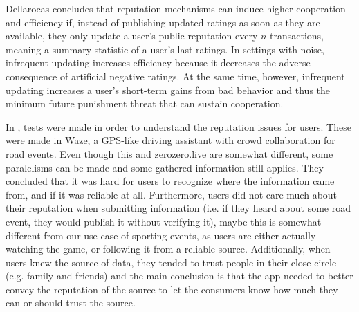 Dellarocas \cite{Dellarocas2006-update-freq} concludes that reputation mechanisms can induce higher cooperation and efficiency if, instead of publishing updated ratings as soon as they are available, they only update a user's public reputation every $n$ transactions, meaning a summary statistic of a user's last ratings. In settings with noise, infrequent updating increases efficiency because it decreases the adverse consequence of artificial negative ratings. At the same time, however, infrequent updating increases a user's short-term gains from bad behavior and thus the minimum future punishment threat that can sustain cooperation.

In \cite{Afonso2016}, tests were made in order to understand the reputation issues for users. These were made in Waze, a GPS-like driving assistant with crowd collaboration for road events. Even though this and zerozero.live are somewhat different, some paralelisms can be made and some gathered information still applies. They concluded that it was hard for users to recognize where the information came from, and if it was reliable at all. Furthermore, users did not care much about their reputation when submitting information (i.e. if they heard about some road event, they would publish it without verifying it), maybe this is somewhat different from our use-case of sporting events, as users are either actually watching the game, or following it from a reliable source. Additionally, when users knew the source of data, they tended to trust people in their close circle (e.g. family and friends) and the main conclusion is that the app needed to better convey the reputation of the source to let the consumers know how much they can or should trust the source.

